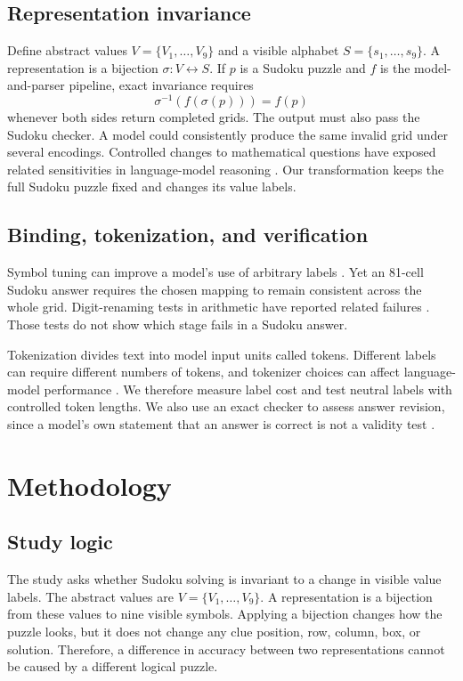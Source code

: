 \documentclass[11pt,a4paper]{article}
\begin{document}
\subsection{Representation invariance}
Define abstract values $V=\{V_1,\ldots,V_9\}$ and a visible alphabet $S=\{s_1,\ldots,s_9\}$. A representation is a bijection $\sigma:V\leftrightarrow S$. If $p$ is a Sudoku puzzle and $f$ is the model-and-parser pipeline, exact invariance requires
\begin{equation}
\sigma^{-1}\!\left(f(\sigma(p))\right)=f(p)
\end{equation}
whenever both sides return completed grids. The output must also pass the Sudoku checker. A model could consistently produce the same invalid grid under several encodings. Controlled changes to mathematical questions have exposed related sensitivities in language-model reasoning \citep{mirzadeh2025gsmsymbolic}. Our transformation keeps the full Sudoku puzzle fixed and changes its value labels.

\subsection{Binding, tokenization, and verification}
Symbol tuning can improve a model's use of arbitrary labels \citep{wei2023symbol}. Yet an 81-cell Sudoku answer requires the chosen mapping to remain consistent across the whole grid. Digit-renaming tests in arithmetic have reported related failures \citep{yan2025addition}. Those tests do not show which stage fails in a Sudoku answer.

Tokenization divides text into model input units called tokens. Different labels can require different numbers of tokens, and tokenizer choices can affect language-model performance \citep{bostrom2020bpe,rust2021tokenizer}. We therefore measure label cost and test neutral labels with controlled token lengths. We also use an exact checker to assess answer revision, since a model's own statement that an answer is correct is not a validity test \citep{stechly2023wrong}.

\section{Methodology}
\subsection{Study logic}
The study asks whether Sudoku solving is invariant to a change in visible value labels.  The abstract values are $V=\{V_1,\ldots,V_9\}$.  A representation is a bijection from these values to nine visible symbols.  Applying a bijection changes how the puzzle looks, but it does not change any clue position, row, column, box, or solution.  Therefore, a difference in accuracy between two representations cannot be caused by a different logical puzzle.
\end{document}
